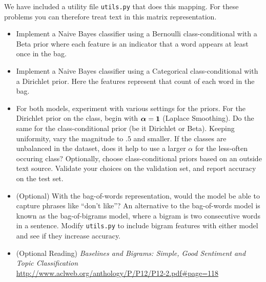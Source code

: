 \begin{problem}
\noindent We have included a utility file \texttt{utils.py} that does this mapping. For
these problems you can therefore treat text in this matrix representation.


\begin{itemize}

	\item Implement a Naive Bayes classifier using a
          Bernoulli class-conditional with a Beta prior
          where each feature is an indicator that
          a word appears at least once in the bag.

    \item Implement a Naive Bayes classifier using a Categorical
          class-conditional with a Dirichlet prior. Here
          the features represent that count of each word in
          the bag.



    \item For both models, experiment with various settings
          for the priors. For the Dirichlet prior on
          the class, begin with $\boldsymbol{\alpha} = \mathbf{1}$
          (Laplace Smoothing).
          Do the same for the class-conditional prior
          (be it Dirichlet or Beta). Keeping uniformity,
          vary the magnitude to $.5$ and smaller. If the
          classes are unbalanced in the dataset, does it help
          to use a larger $\alpha$ for the less-often occuring
          class? Optionally, choose class-conditional priors based on an
          outside text source. Validate your choices on the validation set,
          and report accuracy on the test set.

      \item (Optional) With the bag-of-words representation, 
             would the model be able to capture phrases
             like ``don't like''? An alternative to the bag-of-words model is
          known as the bag-of-bigrams model, where a bigram is two
          consecutive words in a sentence.  Modify \texttt{utils.py}
          to include bigram features with either model and see if they
          increase accuracy.

    \item (Optional Reading) \textit{Baselines and Bigrams: Simple, Good Sentiment and Topic Classification}\\
    \url{http://www.aclweb.org/anthology/P/P12/P12-2.pdf#page=118}\\
\end{itemize}
\end{problem}
